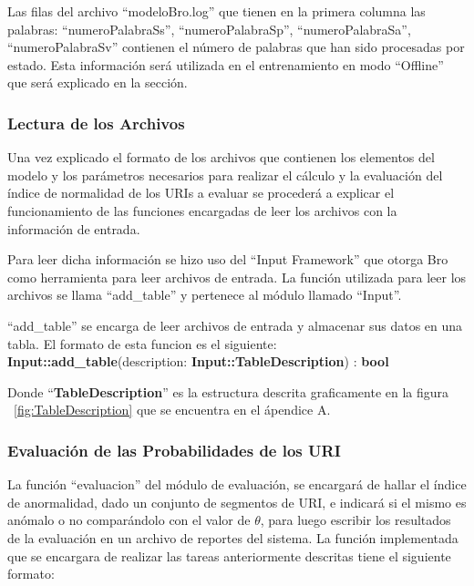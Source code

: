 Las filas del archivo ``modeloBro.log'' que tienen en la primera columna las palabras: ``numeroPalabraSs'', ``numeroPalabraSp'', ``numeroPalabraSa'', ``numeroPalabraSv'' contienen el número de palabras que han sido procesadas por estado. Esta información será utilizada en el entrenamiento en modo ``Offline'' que será explicado en la sección.

\subsubsection*{Lectura de los Archivos}

Una vez explicado el formato de los archivos que contienen los elementos del modelo y los parámetros necesarios para realizar el cálculo y la evaluación del índice de normalidad de los URIs a evaluar se procederá a explicar el funcionamiento de las funciones encargadas de leer los archivos con la información de entrada.

Para leer dicha información se hizo uso del  ``Input Framework'' que otorga Bro como herramienta para leer archivos de entrada. La función utilizada para leer los archivos se llama ``add\_table'' y pertenece al módulo llamado ``Input''.

``add\_table'' se encarga de leer archivos de entrada y almacenar sus datos en una tabla. El formato de esta funcion es el siguiente:\\
%
\textbf{Input::add\_table}(description: \textbf{Input::TableDescription}) : \textbf{bool} 

Donde ``\textbf{TableDescription}'' es la estructura descrita graficamente en
la figura ~\ref{fig:TableDescription} que se encuentra en el ápendice A.

\subsubsection{Evaluación de las Probabilidades de los URI}

La función ``evaluacion'' del módulo de evaluación, se encargará de hallar el  índice de anormalidad, dado un conjunto de segmentos de URI, e indicará si el mismo es anómalo o no comparándolo con el valor
de $\theta$, para luego escribir los resultados de la evaluación en un archivo de reportes del sistema. La función implementada que se encargara de realizar las tareas anteriormente descritas tiene el siguiente formato:

